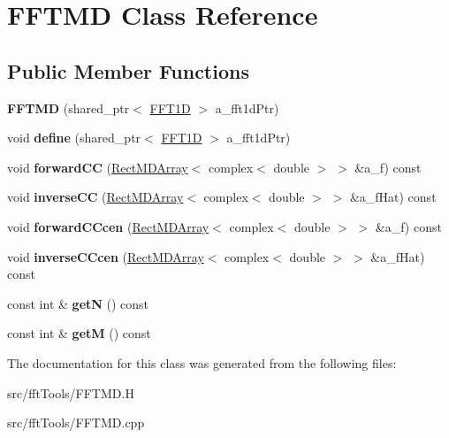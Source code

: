 \hypertarget{class_f_f_t_m_d}{}\section{F\+F\+T\+MD Class Reference}
\label{class_f_f_t_m_d}
\subsection*{Public Member Functions}
\begin{DoxyCompactItemize}
\item 
\mbox{\label{class_f_f_t_m_d_ac1540fd0cca52cec510f8e5cfc4cb222}} 
{\bfseries F\+F\+T\+MD} (shared\+\_\+ptr$<$ \hyperlink{class_f_f_t1_d}{F\+F\+T1D} $>$ a\+\_\+fft1d\+Ptr)
\item 
\mbox{\label{class_f_f_t_m_d_a96afb71bd36d3e970edf77a679a9a3d0}} 
void {\bfseries define} (shared\+\_\+ptr$<$ \hyperlink{class_f_f_t1_d}{F\+F\+T1D} $>$ a\+\_\+fft1d\+Ptr)
\item 
\mbox{\label{class_f_f_t_m_d_ac77ccb3251ca36753d8486482e463571}} 
void {\bfseries forward\+CC} (\hyperlink{class_rect_m_d_array}{Rect\+M\+D\+Array}$<$ complex$<$ double $>$ $>$ \&a\+\_\+f) const
\item 
\mbox{\label{class_f_f_t_m_d_a3a8212aa243e238fe9b6ebc0d75c3b81}} 
void {\bfseries inverse\+CC} (\hyperlink{class_rect_m_d_array}{Rect\+M\+D\+Array}$<$ complex$<$ double $>$ $>$ \&a\+\_\+f\+Hat) const
\item 
\mbox{\label{class_f_f_t_m_d_af3a20a457873df74597751c41f80d624}} 
void {\bfseries forward\+C\+Ccen} (\hyperlink{class_rect_m_d_array}{Rect\+M\+D\+Array}$<$ complex$<$ double $>$ $>$ \&a\+\_\+f) const
\item 
\mbox{\label{class_f_f_t_m_d_a06580a8025af117f54531d83f5e947a5}} 
void {\bfseries inverse\+C\+Ccen} (\hyperlink{class_rect_m_d_array}{Rect\+M\+D\+Array}$<$ complex$<$ double $>$ $>$ \&a\+\_\+f\+Hat) const
\item 
\mbox{\label{class_f_f_t_m_d_a2f578a9fbeb3d759303a5e4f54530f0b}} 
const int \& {\bfseries getN} () const
\item 
\mbox{\label{class_f_f_t_m_d_a78a693aac85a0ceb5d9961c26b3ed704}} 
const int \& {\bfseries getM} () const
\end{DoxyCompactItemize}


The documentation for this class was generated from the following files\+:\begin{DoxyCompactItemize}
\item 
src/fft\+Tools/F\+F\+T\+M\+D.\+H\item 
src/fft\+Tools/F\+F\+T\+M\+D.\+cpp\end{DoxyCompactItemize}
